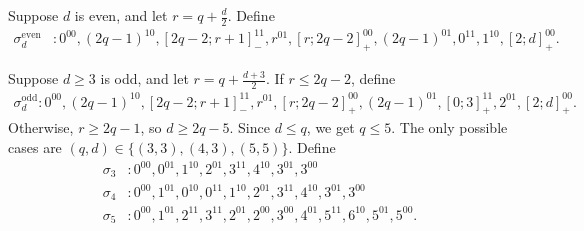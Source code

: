 \documentclass[11pt]{article}
\theoremstyle{definition}
\theoremstyle{remark}
\begin{document}
Suppose $d$ is even, and let $r=q+\frac d2$.
Define
\begin{equation*}
\begin{split}
\sigma_d^{\mathrm{even}}&:
  0^{00},(2q-1)^{10},[2q-2;r+1]_{-}^{11},r^{01},
  [r;2q-2]_{+}^{00},(2q-1)^{01},0^{11},1^{10},[2;d]_{+}^{00}.
\end{split}
\end{equation*}

Suppose $d\ge3$ is odd, and let $r=q+\frac{d+3}{2}$.
If $r\le 2q-2$, define
\begin{equation*}
\begin{split}
\sigma_d^{\mathrm{odd}}:
  0^{00},(2q-1)^{10},[2q-2;r+1]_{-}^{11},r^{01},
  [r;2q-2]_{+}^{00},(2q-1)^{01},
  [0;3]_{+}^{11},2^{01},
  [2;d]_{+}^{00}.
\end{split}
\end{equation*}
Otherwise, $r\geq 2q-1$, so $d\geq2q-5$.
Since $d\leq q$, we get $q\leq 5$. 
The only possible cases are $(q,d)\in\{(3,3),(4,3),(5,5)\}$.
Define
\begin{align*}
\sigma_{3}&:0^{00},0^{01},1^{10},2^{01},3^{11},4^{10},3^{01},3^{00} \\  
\sigma_{4}&:0^{00},1^{01},0^{10},0^{11},1^{10},2^{01},3^{11},4^{10},3^{01},3^{00} \\
\sigma_{5}&:0^{00},1^{01},2^{11},3^{11},2^{01},2^{00},3^{00},4^{01},
  5^{11},6^{10},5^{01},5^{00}.
\end{align*}
\end{document}
